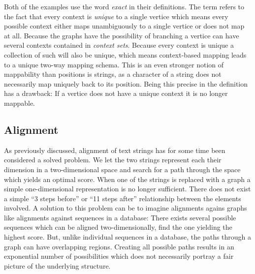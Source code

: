 \documentclass[thesis.tex]{subfiles}
\begin{document}
\par\noindent
Both of the examples use the word \textit{exact} in their definitions. The term refers to the fact that every context is \textit{unique} to a single vertice which means every possible context either maps unambiguously to a single vertice or does not map at all. Because the graphs have the possibility of branching a vertice can have several contexts contained in \textit{context sets}. Because every context is unique a collection of such will also be unique, which means context-based mapping leads to a unique two-way mapping schema. This is an even stronger notion of mappability than positions is strings, as a character of a string does not necessarily map uniquely back to its position. Being this precise in the definition has a drawback: If a vertice does not have a unique context it is no longer mappable. 
\subsection{Alignment}
As previously discussed, alignment of text strings has for some time been considered a solved problem. We let the two strings represent each their dimension in a two-dimensional space and search for a path through the space which yields an optimal score. When one of the strings is replaced with a graph a simple one-dimensional representation is no longer sufficient. There does not exist a simple ``3 steps before'' or ``11 steps after'' relationship between the elements involved. A solution to this problem can be to imagine alignments agains graphs like alignments against sequences in a database: There exists several possible sequences which can be aligned two-dimensionally, find the one yielding the highest score. But, unlike individual sequences in a database, the paths through a graph can have overlapping regions. Creating all possible paths results in an exponential number of possibilities which does not necessarily portray a fair picture of the underlying structure.
\end{document}
